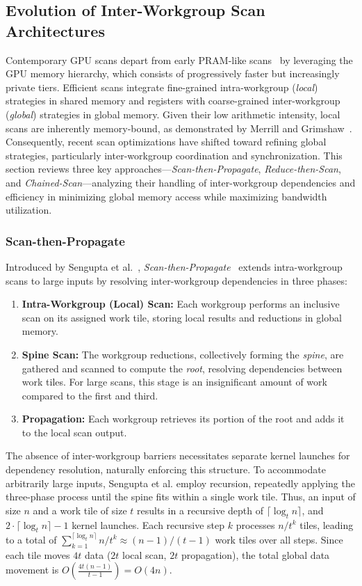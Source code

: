 \documentclass[sigconf]{acmart}
\begin{document}
\subsection{Evolution of Inter-Workgroup Scan Architectures}
Contemporary GPU scans depart from early PRAM-like scans~\cite{Horn, Hensley, Sengupta2006, Gress} by leveraging the GPU memory hierarchy, which consists of progressively faster but increasingly private tiers. Efficient scans integrate fine-grained intra-workgroup (\emph{local}) strategies in shared memory and registers with coarse-grained inter-workgroup (\emph{global}) strategies in global memory. Given their low arithmetic intensity, local scans are inherently memory-bound, as demonstrated by Merrill and Grimshaw~\cite{Merrill2009}. Consequently, recent scan optimizations have shifted toward refining global strategies, particularly inter-workgroup coordination and synchronization. This section reviews three key approaches---\emph{Scan-then-Propagate}, \emph{Reduce-then-Scan}, and \emph{Chained-Scan}---analyzing their handling of inter-workgroup dependencies and efficiency in minimizing global memory access while maximizing bandwidth utilization.

\subsubsection{Scan-then-Propagate}
Introduced by Sengupta et al.~\cite{10.5555/1280094.1280110}, \emph{Scan-then-Propagate}~\cite{GPUGems3, Sengupta2011} extends intra-workgroup scans to large inputs by resolving inter-workgroup dependencies in three phases:
\begin{enumerate}
  \item \textbf{Intra-Workgroup (Local) Scan:}  Each workgroup performs an inclusive scan on its assigned work tile, storing local results and reductions in global memory.
  \item \textbf{Spine Scan:} The workgroup reductions, collectively forming the \emph{spine}, are gathered and scanned to compute the \emph{root}, resolving dependencies between work tiles. For large scans, this stage is an insignificant amount of work compared to the first and third.
  \item \textbf{Propagation:} Each workgroup retrieves its portion of the root and adds it to the local scan output.
\end{enumerate}
The absence of inter-workgroup barriers necessitates separate kernel launches for dependency resolution, naturally enforcing this structure. To accommodate arbitrarily large inputs, Sengupta et al. employ recursion, repeatedly applying the three-phase process until the spine fits within a single work tile. Thus, an input of size $n$ and a work tile of size $t$ results in a recursive depth of $\lceil \log_t n \rceil$, and $2\cdot\lceil \log_t n \rceil - 1$ kernel launches. Each recursive step $k$ processes $n/t^k$ tiles, leading to a total of $\sum_{k=1}^{\lceil \log_t n \rceil} n/t^k \approx (n - 1)/(t - 1)$ work tiles over all steps. Since each tile moves $4t$ data ($2t$ local scan, $2t$ propagation), the total global data movement is $O\left(\frac{4t(n - 1)}{t - 1}\right) = O(4n)$.
\end{document}
